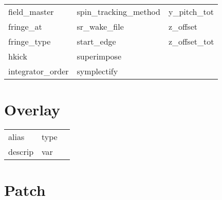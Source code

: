 \begin{tabular}{lll}
field_master                & spin_tracking_method        & y_pitch_tot                 \\
fringe_at                   & sr_wake_file                & z_offset                    \\
fringe_type                 & start_edge                  & z_offset_tot                \\
hkick                       & superimpose                 &                             \\
integrator_order            & symplectify                 &                             \\
 \bottomrule
 \end{tabular}
 \vfill
 
 \section{Overlay}
 \label{s:list.overlay}
 
 \begin{tabular}{lll} \toprule
alias                       & type                        &                             \\
descrip                     & var                         &                             \\
 \bottomrule
 \end{tabular}
 \vfill
 
 \section{Patch}
 \label{s:list.patch}
 
